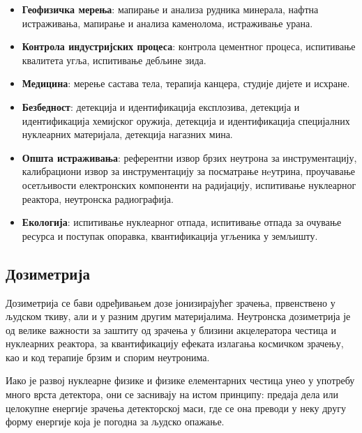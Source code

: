 \documentclass[11pt,a4paper,serbian,oneside]{book}
\begin{document}
\begin{itemize}
  
  \item \textbf{Геофизичка мерења}: мапирање и анализа рудника минерала, нафтна истраживања, мапирање и анализа каменолома, истраживање урана.

  \item \textbf{Контрола индустријских процеса}: контрола цементног процеса, испитивање ква\-ли\-те\-та угља, испитивање дебљине зида.

  \item \textbf{Медицина}: мерење састава тела, терапија канцера, студије дијете и исхране.

  \item \textbf{Безбедност}: детекција и идентификација експлозива, детекција и идентификација хемијског оружија, детекција и идентификација специјалних нуклеарних материјала, детекција нагазних мина.

  \item \textbf{Општа истраживања}: референтни извор брзих неутрона за инструментацију, ка\-ли\-бра\-ци\-они извор за инструментацију за посматрање нeутрина, проучавање осетљивости електронских компоненти на радијацију, испитивање нуклеарног реактора, неутронска радиографија.

  \item \textbf{Екологија}: испитивање нуклеарног отпада, испитивање отпада за очување ресурса и поступак опоравка, квантификација угљеника у земљишту.

\end{itemize}

\subsection{Дозиметрија}

Дозиметрија \cite{bmilenkovic} се бави одређивањем дозе јонизирајућег зрачења, првенствено у људском ткиву, али и у разним другим материјалима. Неутронска дозиметрија је од велике важности за заштиту од зрачења у близини акцелератора честица и нуклеарних реактора, за кван\-ти\-фи\-ка\-ци\-ју ефеката излагања космичком зрачењу, као и код терапије брзим и спорим неутронима.

Иако је развој нуклеарне физике и физике елементарних честица унео у употребу много врста детектора, они се заснивају на истом принципу: предаја дела или целокупне енергије зрачења детекторској маси, где се она преводи у неку другу форму енергије која је погодна за људско опажање.
\end{document}
